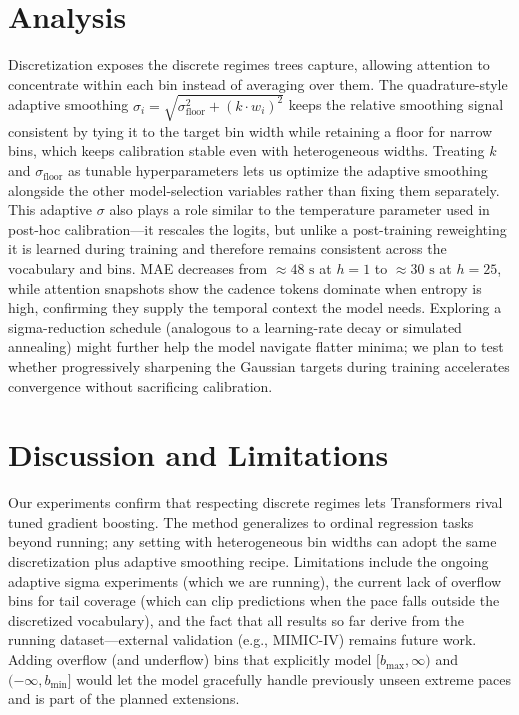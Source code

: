 \documentclass{article}
\begin{document}
\section{Analysis}
Discretization exposes the discrete regimes trees capture, allowing attention to concentrate within each bin instead of averaging over them. The quadrature-style adaptive smoothing \(\sigma_i = \sqrt{\sigma_{\text{floor}}^2 + (k \cdot w_i)^2}\) keeps the relative smoothing signal consistent by tying it to the target bin width while retaining a floor for narrow bins, which keeps calibration stable even with heterogeneous widths. Treating \(k\) and \(\sigma_{\text{floor}}\) as tunable hyperparameters lets us optimize the adaptive smoothing alongside the other model-selection variables rather than fixing them separately. This adaptive \(\sigma\) also plays a role similar to the temperature parameter used in post-hoc calibration—it rescales the logits, but unlike a post-training reweighting it is learned during training and therefore remains consistent across the vocabulary and bins. MAE decreases from \(\approx48\text{ s}\) at \(h=1\) to \(\approx30\text{ s}\) at \(h=25\), while attention snapshots show the cadence tokens dominate when entropy is high, confirming they supply the temporal context the model needs. Exploring a sigma-reduction schedule (analogous to a learning-rate decay or simulated annealing) might further help the model navigate flatter minima; we plan to test whether progressively sharpening the Gaussian targets during training accelerates convergence without sacrificing calibration.
\section{Discussion and Limitations}
Our experiments confirm that respecting discrete regimes lets Transformers rival tuned gradient boosting. The method generalizes to ordinal regression tasks beyond running; any setting with heterogeneous bin widths can adopt the same discretization plus adaptive smoothing recipe. Limitations include the ongoing adaptive sigma experiments (which we are running), the current lack of overflow bins for tail coverage (which can clip predictions when the pace falls outside the discretized vocabulary), and the fact that all results so far derive from the running dataset—external validation (e.g., MIMIC-IV) remains future work. Adding overflow (and underflow) bins that explicitly model \([b_{\text{max}}, \infty)\) and \((-\infty, b_{\text{min}}]\) would let the model gracefully handle previously unseen extreme paces and is part of the planned extensions.
\end{document}

